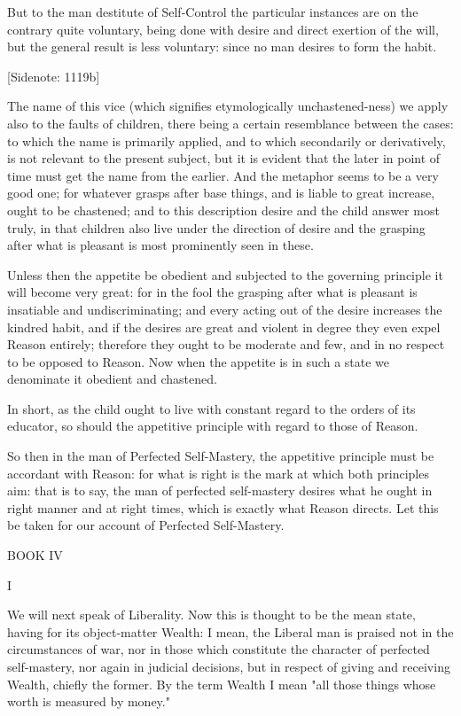But to the man destitute of Self-Control the particular instances are on
the contrary quite voluntary, being done with desire and direct exertion
of the will, but the general result is less voluntary: since no man
desires to form the habit.

[Sidenote: 1119b]

The name of this vice (which signifies etymologically unchastened-ness)
we apply also to the faults of children, there being a certain
resemblance between the cases: to which the name is primarily applied,
and to which secondarily or derivatively, is not relevant to the present
subject, but it is evident that the later in point of time must get the
name from the earlier. And the metaphor seems to be a very good one;
for whatever grasps after base things, and is liable to great increase,
ought to be chastened; and to this description desire and the child
answer most truly, in that children also live under the direction of
desire and the grasping after what is pleasant is most prominently seen
in these.

Unless then the appetite be obedient and subjected to the governing
principle it will become very great: for in the fool the grasping after
what is pleasant is insatiable and undiscriminating; and every acting
out of the desire increases the kindred habit, and if the desires are
great and violent in degree they even expel Reason entirely; therefore
they ought to be moderate and few, and in no respect to be opposed
to Reason. Now when the appetite is in such a state we denominate it
obedient and chastened.

In short, as the child ought to live with constant regard to the orders
of its educator, so should the appetitive principle with regard to those
of Reason.

So then in the man of Perfected Self-Mastery, the appetitive principle
must be accordant with Reason: for what is right is the mark at which
both principles aim: that is to say, the man of perfected self-mastery
desires what he ought in right manner and at right times, which is
exactly what Reason directs. Let this be taken for our account of
Perfected Self-Mastery.




BOOK IV

I

We will next speak of Liberality. Now this is thought to be the mean
state, having for its object-matter Wealth: I mean, the Liberal man is
praised not in the circumstances of war, nor in those which constitute
the character of perfected self-mastery, nor again in judicial
decisions, but in respect of giving and receiving Wealth, chiefly the
former. By the term Wealth I mean "all those things whose worth is
measured by money."

